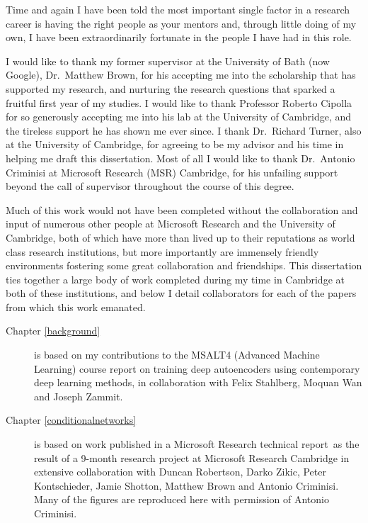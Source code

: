 
\begin{acknowledgements}      

Time and again I have been told the most important single factor in a research career is having the right people as your mentors and, through little doing of my own, I have been extraordinarily fortunate in the people I have had in this role. 

I would like to thank my former supervisor at the University of Bath (now Google), Dr.~Matthew Brown, for his accepting me into the scholarship that has supported my research, and nurturing the research questions that sparked a fruitful first year of my studies. I would like to thank Professor Roberto Cipolla for so generously accepting me into his lab at the University of Cambridge, and the tireless support he has shown me ever since. I thank Dr.~Richard Turner, also at the University of Cambridge, for agreeing to be my advisor and his time in helping me draft this dissertation. Most of all I would like to thank Dr.~Antonio Criminisi at Microsoft Research (MSR) Cambridge, for his unfailing support beyond the call of supervisor throughout the course of this degree.

Much of this work would not have been completed without the collaboration and input of numerous other people at Microsoft Research and the University of Cambridge, both of which have more than lived up to their reputations as world class research institutions, but more importantly are immensely friendly environments fostering some great collaboration and friendships. This dissertation ties together a large body of work completed during my time in Cambridge at both of these institutions, and below I detail collaborators for each of the papers from which this work emanated.

\begin{description}
	\item[Chapter \ref{background}] is based on my contributions to the MSALT4 (Advanced Machine Learning) course report on training deep autoencoders using contemporary deep learning methods, in collaboration with Felix Stahlberg, Moquan Wan and Joseph Zammit.

	\item[Chapter \ref{conditionalnetworks}] is based on work published in a Microsoft Research technical report~\citep{Ioannou2015}as the result of a 9-month research project at Microsoft Research Cambridge in extensive collaboration with Duncan Robertson, Darko Zikic, Peter Kontschieder, Jamie Shotton, Matthew Brown and Antonio Criminisi. Many of the figures are reproduced here with permission of Antonio Criminisi.


\end{description}
\end{acknowledgements}
